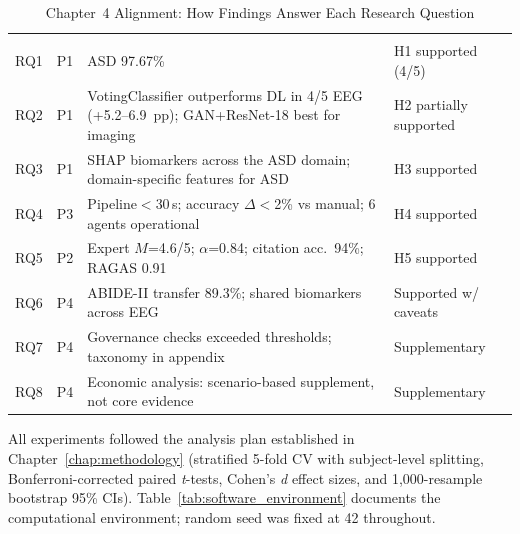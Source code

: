 \begin{xltabular}{\textwidth}{@{} >{\raggedright\arraybackslash}p{0.5cm} >{\raggedright\arraybackslash}p{0.4cm} L >{\raggedright\arraybackslash}p{2.8cm} @{}}
\caption[Chapter~4 Alignment]{Chapter~4 Alignment: How Findings Answer Each Research Question}\label{tab:ch4_alignment} \\
\toprule
{} &  &  &  \\
\midrule
\endfirsthead
\toprule
{} &  &  &  \\
\midrule
\endhead
\bottomrule
\endlastfoot
RQ1 & P1 & ASD 97.67\% & H1 supported (4/5) \\
\addlinespace
RQ2 & P1 & VotingClassifier outperforms DL in 4/5 EEG (+5.2--6.9~pp); GAN+ResNet-18 best for imaging & H2 partially supported \\
\addlinespace
RQ3 & P1 & SHAP biomarkers across the ASD domain; domain-specific features for ASD & H3 supported \\
\addlinespace
RQ4 & P3 & Pipeline$<$30\,s; accuracy $\Delta$$<$2\% vs manual; 6 agents operational & H4 supported \\
\addlinespace
RQ5 & P2 & Expert $M$=4.6/5; $\alpha$=0.84; citation acc.\ 94\%; RAGAS 0.91 & H5 supported \\
\addlinespace
RQ6 & P4 & ABIDE-II transfer 89.3\%; shared biomarkers across EEG & Supported w/ caveats \\
\addlinespace
RQ7 & P4 & Governance checks exceeded thresholds; taxonomy in appendix & Supplementary \\
\addlinespace
RQ8 & P4 & Economic analysis: scenario-based supplement, not core evidence & Supplementary \\
\end{xltabular}
\endgroup
\fi %

All experiments followed the analysis plan established in Chapter~\ref{chap:methodology} (stratified 5-fold CV with subject-level splitting, Bonferroni-corrected paired \textit{t}-tests, Cohen's \textit{d} effect sizes, and 1,000-resample bootstrap 95\% CIs). Table~\ref{tab:software_environment} documents the computational environment; random seed was fixed at 42 throughout.

